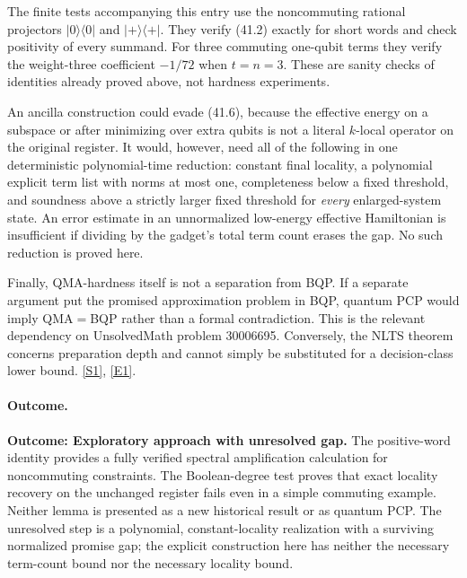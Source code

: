 \documentclass[11pt,a4paper]{article}
\newcommand{\sref}[2]{\hyperlink{source:#1:#2}{[S#2]}}
\newcommand{\eref}[2]{\hyperlink{extra:#1:#2}{[E#2]}}
\numberwithin{equation}{section}
\begin{document}
The finite tests accompanying this entry use the noncommuting rational
projectors $|0\rangle\langle0|$ and $|+\rangle\langle+|$. They verify
(41.2) exactly for short words and check positivity of every summand.
For three commuting one-qubit terms they verify the weight-three
coefficient $-1/72$ when $t=n=3$. These are sanity checks of identities
already proved above, not hardness experiments.

An ancilla construction could evade (41.6), because the effective energy
on a subspace or after minimizing over extra qubits is not a literal
$k$-local operator on the original register. It would, however, need all
of the following in one deterministic polynomial-time reduction:
constant final locality, a polynomial explicit term list with norms at
most one, completeness below a fixed threshold, and soundness above a
strictly larger fixed threshold for \emph{every} enlarged-system state.
An error estimate in an unnormalized low-energy effective Hamiltonian is
insufficient if dividing by the gadget's total term count erases the gap.
No such reduction is proved here.

Finally, QMA-hardness itself is not a separation from BQP. If a separate
argument put the promised approximation problem in BQP, quantum PCP would
imply QMA$=$BQP rather than a formal contradiction. This is the relevant
dependency on UnsolvedMath problem 30006695. Conversely, the NLTS theorem concerns preparation
depth and cannot simply be substituted for a decision-class lower bound.
\sref{30006691}{1}, \eref{30006691}{1}.

\paragraph{Outcome.}
\textbf{Outcome: Exploratory approach with unresolved gap.}
The positive-word identity provides a fully verified spectral
amplification calculation for noncommuting constraints. The Boolean-degree
test proves that exact locality recovery on the unchanged register fails
even in a simple commuting example. Neither lemma is presented as a new
historical result or as quantum PCP. The unresolved step is a polynomial,
constant-locality realization with a surviving normalized promise gap;
the explicit construction here has neither the necessary term-count bound
nor the necessary locality bound.
\end{document}
